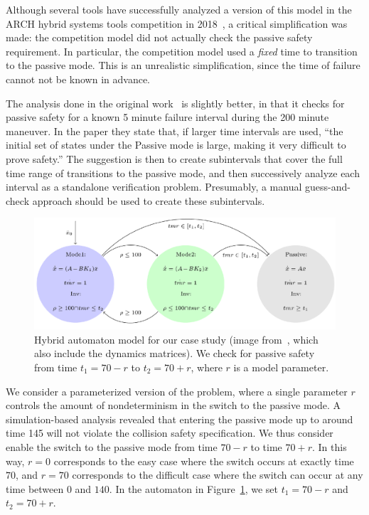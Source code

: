 Although several tools have successfully analyzed a version of this model in the ARCH hybrid systems tools competition in
2018~\cite{archcomp18linear}, a critical simplification was made: the competition model did not actually check the passive safety requirement.
%
In particular, the competition model used a \emph{fixed} time to transition to the passive mode.
%
This is an unrealistic simplification, since the time of failure cannot not be known in advance.


The analysis done in the original work~\cite{chan2017verifying} is slightly better, in that it checks for passive safety for a known 5 minute failure interval during the 200 minute maneuver.
%
In the paper they state that, if larger time intervals are used,
``the initial set of states under the Passive mode is large, making it very difficult to prove safety.''
%
The suggestion is then to create subintervals that cover the full time range of transitions to the passive mode, and then successively
analyze each interval as a standalone verification problem.
%
Presumably, a manual guess-and-check approach should be used to create these subintervals.

\begin{figure}[t]
\centerline{\includegraphics[width=0.9\columnwidth]{images/ha.png}}
\caption{Hybrid automaton model for our case study (image from~\cite{chan2017verifying}, which also include the dynamics matrices). We check for passive safety
  from time $t_1=70 - r$ to $t_2=70 + r$, where $r$ is a model parameter.}
\label{fig:ha}
\end{figure}

We consider a parameterized version of the problem, where a single parameter $r$ controls the amount of nondeterminism in the switch to the passive mode.
%
A simulation-based analysis revealed that entering the passive mode up to around time 145 will not violate the collision safety specification.
%
We thus consider enable the switch to the passive mode from time $70-r$ to time $70+r$.
%
In this way, $r=0$ corresponds to the easy case where the switch
occurs at exactly time $70$, and $r=70$ corresponds to the difficult case where the switch can occur at any time between $0$ and $140$.
%
In the automaton in Figure~\ref{fig:ha}, we set $t_1=70 - r$ and $t_2=70 + r$.

